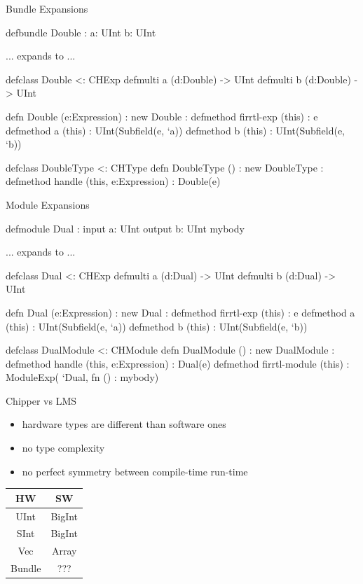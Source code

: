 \documentclass[xcolor=pdflatex,dvipsnames,table]{beamer}
\begin{document}
\begin{frame}[fragile]{Bundle Expansions}

\begin{stanza}
defbundle Double :
   a: UInt
   b: UInt
\end{stanza}

... expands to ...

{
\begin{stanza}
defclass Double <: CHExp
defmulti a (d:Double) -> UInt
defmulti b (d:Double) -> UInt

defn Double (e:Expression) :
   new Double :
      defmethod firrtl-exp (this) : e
      defmethod a (this) :
         UInt(Subfield(e, `a))
      defmethod b (this) :
         UInt(Subfield(e, `b))

defclass DoubleType <: CHType
defn DoubleType () :
   new DoubleType :
      defmethod handle (this, e:Expression) :
         Double(e)
\end{stanza}
}
\end{frame}

\begin{frame}[fragile]{Module Expansions}

\begin{stanza}
defmodule Dual :
   input a: UInt
   output b: UInt
   mybody
\end{stanza}

... expands to ...

{
\begin{stanza}
defclass Dual <: CHExp
defmulti a (d:Dual) -> UInt
defmulti b (d:Dual) -> UInt

defn Dual (e:Expression) :
   new Dual :
      defmethod firrtl-exp (this) : e
      defmethod a (this) :
         UInt(Subfield(e, `a))
      defmethod b (this) :
         UInt(Subfield(e, `b))

defclass DualModule <: CHModule
defn DualModule () :
   new DualModule :
      defmethod handle (this, e:Expression) :
         Dual(e)
      defmethod firrtl-module (this) :
         ModuleExp(
            `Dual,
            fn () : mybody)
\end{stanza}
}
\end{frame}

\begin{frame}[fragile]{Chipper vs LMS}
\begin{itemize}
\item hardware types are different than software ones
\item no type complexity
\item no perfect symmetry between compile-time run-time
\end{itemize}
\begin{tabular}{|c|c|}
\hline
{\bf HW} & {\bf SW} \\
\hline
\hline
UInt & BigInt \\
\hline
SInt & BigInt \\
\hline
Vec & Array \\
\hline
Bundle & ??? \\
\hline
\end{tabular}
\end{frame}
\end{document}
